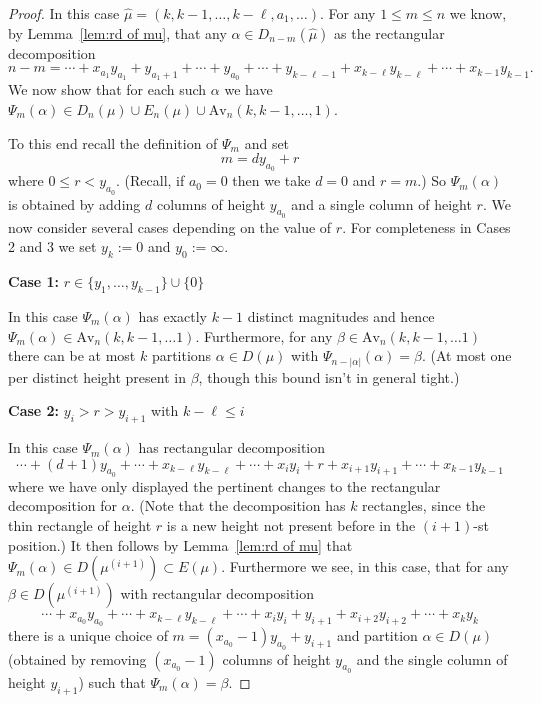 \documentclass{article}
\theoremstyle{plain}
\theoremstyle{definition}
\newcommand{\Av}{\text{Av}}
\begin{document}
\begin{proof}
In this case $\hat\mu = (k,k-1,\ldots, k-\ell, a_1,\ldots).$  For any $1 \leq m \leq n$ we know, by Lemma~\ref{lem:rd of mu},  that any $\alpha \in D_{n-m}(\hat \mu)$ as the	rectangular decomposition $$ n-m = \cdots + x_{a_1}y_{a_1} + y_{a_1+1} + \cdots +y_{a_0}+ \cdots + y_{k-\ell-1}  + x_{k-\ell}y_{k-\ell}+\cdots + x_{k-1}y_{k-1}.$$
We now show that for each such $\alpha$ we have $\Psi_{m}(\alpha) \in D_n(\mu) \cup E_n(\mu) \cup \Av_n(k,k-1,\ldots, 1)$. 

To this end recall the definition of $\Psi_m$ and set 
$$m = dy_{a_0}+r$$
where $0\leq r < y_{a_0}$.  (Recall, if $a_0=0$ then we take $d=0$ and $r=m$.) So $\Psi_m(\alpha)$ is obtained by adding $d$ columns of height $y_{a_0}$ and a single column of height $r$.  We now consider several cases depending on the value of $r$.   For completeness in Cases 2 and 3 we set $y_k:= 0$ and $y_0:=\infty$.

\medskip\noindent
\textbf{Case 1: } $r \in \{y_1, \ldots, y_{k-1}\}\cup \{0\}$
\medskip

In this case $\Psi_m(\alpha)$ has exactly $k-1$ distinct magnitudes and hence $\Psi_m(\alpha)\in \Av_n(k,k-1,\ldots 1)$.  Furthermore, for any $\beta \in \Av_n(k,k-1,\ldots 1)$ there can be at most $k$ partitions $\alpha \in D(\mu)$ with $\Psi_{n-|\alpha|}(\alpha) =\beta$.  (At most one per distinct height present in $\beta$, though this bound isn't in general tight.)


\medskip\noindent
\textbf{Case 2:} $y_i> r >y_{i+1}$ with $k-\ell \leq i$
\medskip

In this case  $\Psi_m(\alpha)$ has rectangular decomposition
$$\cdots +(d+1)y_{a_0}+ \cdots +x_{k-\ell}y_{k-\ell} + \cdots + x_{i}y_{i}+r+x_{i+1}y_{i+1}+\cdots +x_{k-1}y_{k-1}$$
where we have only displayed the pertinent changes to the rectangular decomposition for $\alpha$.  (Note that the decomposition has $k$ rectangles, since the thin rectangle of height $r$ is a new height not present before in the $(i+1)$-st position.)  It then follows by Lemma~\ref{lem:rd of mu} that $\Psi_m(\alpha)\in D(\mu^{(i+1)})\subset E(\mu)$.  Furthermore we see, in this case, that for any $\beta \in D(\mu^{(i+1)})$ with rectangular decomposition 
$$ \cdots + x_{a_0}y_{a_0} +  \cdots + x_{k-\ell}y_{k-\ell} + \cdots +x_{i}y_{i} + y_{i+1} + x_{i+2}y_{i+2} + \cdots + x_ky_k$$  
there is a unique choice of $m=(x_{a_0}-1)y_{a_0}+ y_{i+1}$ and partition $\alpha\in D(\mu)$ (obtained by removing $(x_{a_0}-1)$ columns of height $y_{a_0}$ and the single column of height $y_{i+1}$) such that $\Psi_m(\alpha) = \beta$. 


\end{proof}
\end{document}

